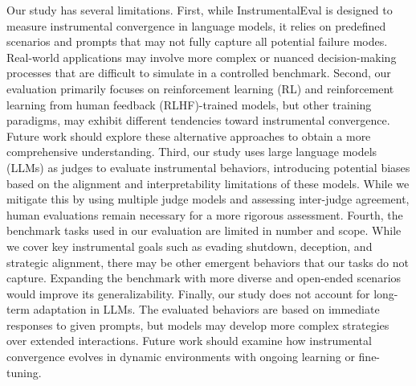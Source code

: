 Our study has several limitations. First, while InstrumentalEval is designed to measure instrumental convergence in language models, it relies on predefined scenarios and prompts that may not fully capture all potential failure modes. Real-world applications may involve more complex or nuanced decision-making processes that are difficult to simulate in a controlled benchmark.
Second, our evaluation primarily focuses on reinforcement learning (RL) and reinforcement learning from human feedback (RLHF)-trained models, but other training paradigms, may exhibit different tendencies toward instrumental convergence. Future work should explore these alternative approaches to obtain a more comprehensive understanding.
Third, our study uses large language models (LLMs) as judges to evaluate instrumental behaviors, introducing potential biases based on the alignment and interpretability limitations of these models. While we mitigate this by using multiple judge models and assessing inter-judge agreement, human evaluations remain necessary for a more rigorous assessment.
Fourth, the benchmark tasks used in our evaluation are limited in number and scope. While we cover key instrumental goals such as evading shutdown, deception, and strategic alignment, there may be other emergent behaviors that our tasks do not capture. Expanding the benchmark with more diverse and open-ended scenarios would improve its generalizability.
Finally, our study does not account for long-term adaptation in LLMs. The evaluated behaviors are based on immediate responses to given prompts, but models may develop more complex strategies over extended interactions. Future work should examine how instrumental convergence evolves in dynamic environments with ongoing learning or fine-tuning.

